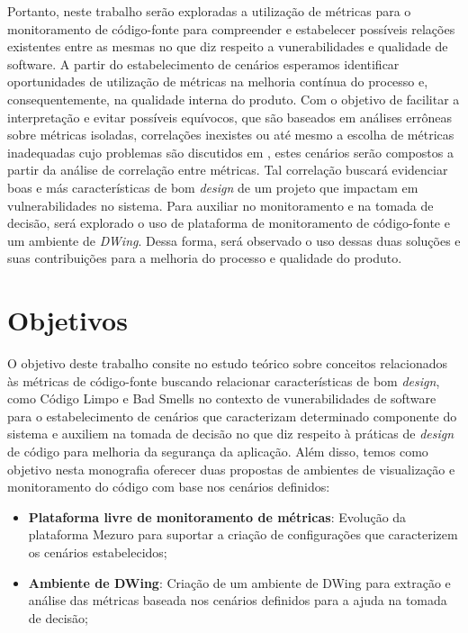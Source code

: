 Portanto, neste trabalho serão exploradas a utilização de métricas para o monitoramento de código-fonte para compreender e estabelecer possíveis relações existentes entre as mesmas no que diz respeito a vunerabilidades e qualidade de software.
%
A partir do estabelecimento de cenários esperamos identificar oportunidades de utilização de métricas na melhoria contínua do processo e, consequentemente, na qualidade interna do produto. Com o objetivo de facilitar a interpretação e evitar possíveis equívocos, que são baseados em análises errôneas sobre métricas isoladas, correlações inexistes ou até mesmo a escolha de métricas inadequadas cujo problemas são discutidos em \cite{chidamber1994}, estes cenários serão compostos a partir da análise de correlação entre métricas. Tal correlação buscará evidenciar boas e más características de bom \emph{design} de um projeto que impactam em vulnerabilidades no sistema.
%
Para auxiliar no monitoramento e na tomada de decisão, será explorado o uso de plataforma de monitoramento de código-fonte e um ambiente de \emph{DWing}.
%
Dessa forma, será observado o uso dessas duas soluções e suas contribuições para a melhoria do processo e qualidade do produto.


\section{Objetivos}

O objetivo deste trabalho consite no estudo teórico sobre conceitos relacionados às métricas de código-fonte buscando relacionar características de bom \emph{design}, como Código Limpo e Bad Smells no contexto de vunerabilidades de software  para o estabelecimento de cenários que caracterizam determinado componente do sistema e auxiliem na tomada de decisão no que diz respeito à práticas de \emph{design} de código para melhoria da segurança da aplicação.
%
Além disso, temos como objetivo nesta monografia oferecer duas propostas de ambientes de visualização e monitoramento do código com base nos cenários definidos:
\begin{itemize}
\item \textbf{Plataforma livre de monitoramento de métricas}: Evolução da plataforma Mezuro para suportar a criação de configurações que caracterizem os cenários estabelecidos;
\item \textbf{Ambiente de DWing}: Criação de um ambiente de DWing para extração e análise das métricas baseada nos cenários definidos para a ajuda na tomada de decisão;
\end{itemize}


